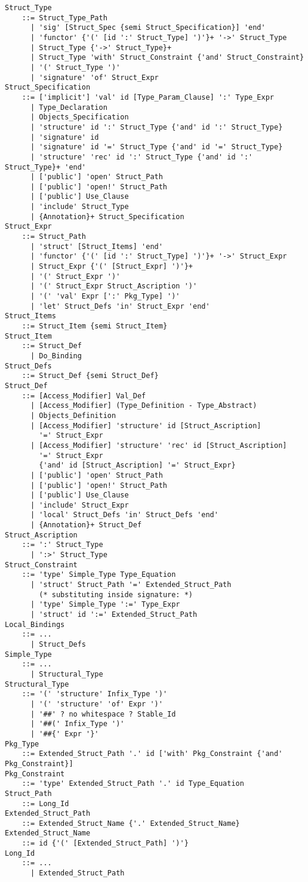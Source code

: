 \grammar\begin{lstlisting}[deletekeywords={no}]
Struct_Type 
    ::= Struct_Type_Path
      | 'sig' [Struct_Spec {semi Struct_Specification}] 'end'
      | 'functor' {'(' [id ':' Struct_Type] ')'}+ '->' Struct_Type
      | Struct_Type {'->' Struct_Type}+
      | Struct_Type 'with' Struct_Constraint {'and' Struct_Constraint}
      | '(' Struct_Type ')'
      | 'signature' 'of' Struct_Expr
Struct_Specification
    ::= ['implicit'] 'val' id [Type_Param_Clause] ':' Type_Expr
      | Type_Declaration
      | Objects_Specification
      | 'structure' id ':' Struct_Type {'and' id ':' Struct_Type}
      | 'signature' id
      | 'signature' id '=' Struct_Type {'and' id '=' Struct_Type}
      | 'structure' 'rec' id ':' Struct_Type {'and' id ':' Struct_Type}+ 'end'
      | ['public'] 'open' Struct_Path
      | ['public'] 'open!' Struct_Path
      | ['public'] Use_Clause
      | 'include' Struct_Type
      | {Annotation}+ Struct_Specification
Struct_Expr 
    ::= Struct_Path
      | 'struct' [Struct_Items] 'end'
      | 'functor' {'(' [id ':' Struct_Type] ')'}+ '->' Struct_Expr
      | Struct_Expr {'(' [Struct_Expr] ')'}+
      | '(' Struct_Expr ')'
      | '(' Struct_Expr Struct_Ascription ')'
      | '(' 'val' Expr [':' Pkg_Type] ')'
      | 'let' Struct_Defs 'in' Struct_Expr 'end'
Struct_Items 
    ::= Struct_Item {semi Struct_Item} 
Struct_Item 
    ::= Struct_Def 
      | Do_Binding
Struct_Defs
    ::= Struct_Def {semi Struct_Def} 
Struct_Def 
    ::= [Access_Modifier] Val_Def
      | [Access_Modifier] (Type_Definition - Type_Abstract)
      | Objects_Definition
      | [Access_Modifier] 'structure' id [Struct_Ascription] 
        '=' Struct_Expr
      | [Access_Modifier] 'structure' 'rec' id [Struct_Ascription] 
        '=' Struct_Expr 
        {'and' id [Struct_Ascription] '=' Struct_Expr}
      | ['public'] 'open' Struct_Path
      | ['public'] 'open!' Struct_Path
      | ['public'] Use_Clause
      | 'include' Struct_Expr
      | 'local' Struct_Defs 'in' Struct_Defs 'end'
      | {Annotation}+ Struct_Def
Struct_Ascription 
    ::= ':' Struct_Type
      | ':>' Struct_Type
Struct_Constraint 
    ::= 'type' Simple_Type Type_Equation
      | 'struct' Struct_Path '=' Extended_Struct_Path
        (* substituting inside signature: *)
      | 'type' Simple_Type ':=' Type_Expr
      | 'struct' id ':=' Extended_Struct_Path
Local_Bindings
    ::= ...
      | Struct_Defs
Simple_Type 
    ::= ...
      | Structural_Type
Structural_Type
    ::= '(' 'structure' Infix_Type ')'
      | '(' 'structure' 'of' Expr ')'
      | '##' ? no whitespace ? Stable_Id
      | '##(' Infix_Type ')' 
      | '##{' Expr '}' 
Pkg_Type 
    ::= Extended_Struct_Path '.' id ['with' Pkg_Constraint {'and' Pkg_Constraint}]
Pkg_Constraint
    ::= 'type' Extended_Struct_Path '.' id Type_Equation 
Struct_Path
    ::= Long_Id
Extended_Struct_Path 
    ::= Extended_Struct_Name {'.' Extended_Struct_Name}
Extended_Struct_Name 
    ::= id {'(' [Extended_Struct_Path] ')'}
Long_Id
    ::= ...
      | Extended_Struct_Path
\end{lstlisting}






